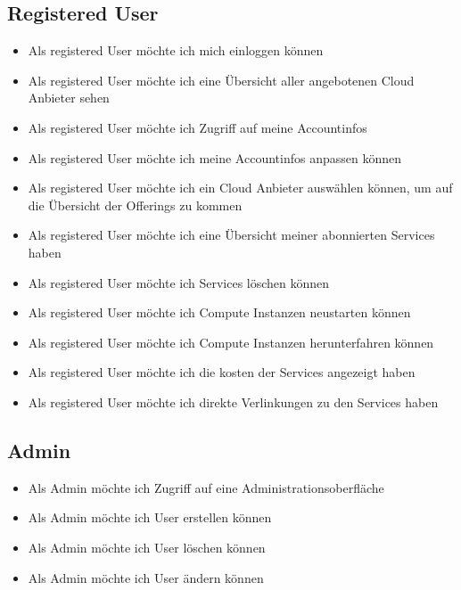 \documentclass[11pt]{scrartcl}
\begin{document}
\subsection{Registered User}
\begin{itemize}
  \item Als registered User möchte ich mich einloggen können
  \item Als registered User möchte ich eine Übersicht aller angebotenen Cloud 
  Anbieter sehen
  \item Als registered User möchte ich Zugriff auf meine Accountinfos
  \item Als registered User möchte ich meine Accountinfos anpassen können
  \item Als registered User möchte ich ein Cloud Anbieter auswählen können, um 
  auf die Übersicht der Offerings zu kommen
  \item Als registered User möchte ich eine Übersicht meiner abonnierten 
  Services haben
  \item Als registered User möchte ich Services löschen können
  \item Als registered User möchte ich Compute Instanzen neustarten können
  \item Als registered User möchte ich Compute Instanzen herunterfahren können
  \item Als registered User möchte ich die kosten der Services angezeigt haben
  \item Als registered User möchte ich direkte Verlinkungen zu den Services 
  haben
\end{itemize}

 
\subsection{Admin}
\begin{itemize}
  \item Als Admin möchte ich Zugriff auf eine Administrationsoberfläche
  \item Als Admin möchte ich User erstellen können
  \item Als Admin möchte ich User löschen können
  \item Als Admin möchte ich User ändern können
\end{itemize}
\end{document}
